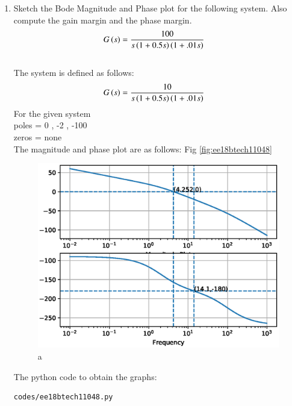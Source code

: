 \begin{enumerate}[label=\thesection.\arabic*.,ref=\thesection.\theenumi]

\item Sketch the Bode Magnitude and Phase plot for the following system. Also compute the gain margin and the phase margin.
\begin{align}
G\left(s\right) &= \frac{100}{s\left(1+0.5s\right)\left(1+.01s\right)}
\label{eq:ee18btech11048_2}
\end{align}
\\
\solution 
The system is defined as follows:
\begin{align}
G\left(s\right) &= \frac{10}{s\left(1+0.5s\right)\left(1+.01s\right)}
\end{align}
For the given system\\
poles = 0 , -2 , -100\\
zeros = none\\
The magnitude and phase plot are as follows: Fig  \ref{fig:ee18btech11048} 
\begin{figure}[!h]
\centering
  \includegraphics[width=\columnwidth]{./figs/ee18btech11048.eps}
  \caption{a}
\end{figure}

The python code to obtain the graphs:

\begin{lstlisting}
codes/ee18btech11048.py
\end{lstlisting}


\end{enumerate}
